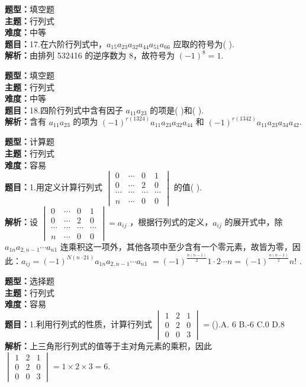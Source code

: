 \documentclass{ctexart}
\newenvironment{question}[5]{%
	\noindent\textbf{题型：}#1\\
	\textbf{主题：}#2\\
	\textbf{难度：}#3\\
	\textbf{题目：}#4\\
	\textbf{解析：}#5\\
	\vspace{1em}
}{}
\begin{document}
	\begin{question}
		{填空题}
		{行列式}
		{中等}
		{17.在六阶行列式中，\(a_{15} a_{23} a_{32} a_{44} a_{51} a_{66}\) 应取的符号为(  ).}
		{由排列 532416 的逆序数为 8，故符号为 \((-1)^8 = 1\).}
	\end{question}
	
	\begin{question}
		{填空题}
		{行列式}
		{中等}
		{18.四阶行列式中含有因子 \(a_{11} a_{23}\) 的项是(  )和(  ).}
		{含有 \(a_{11} a_{23}\) 的项为 \((-1)^{r(1324)} a_{11} a_{23} a_{32} a_{44}\) 和 \((-1)^{r(1342)} a_{11} a_{23} a_{34} a_{42}\).}
	\end{question}
	
	
	\begin{question}
		{计算题}
		{行列式}
		{容易}
		{1.用定义计算行列式 \(\begin{vmatrix}0 & \cdots & 0 & 1 \\ 0 & \cdots & 2 & 0 \\ \cdots & \cdots & \cdots & \cdots \\ n & \cdots & 0 & 0\end{vmatrix}\) 的值(  ).}
		{设 \(\begin{vmatrix}0 & \cdots & 0 & 1 \\ 0 & \cdots & 2 & 0 \\ \cdots & \cdots & \cdots & \cdots \\ n & \cdots & 0 & 0\end{vmatrix}=a_{i j}\) ，根据行列式的定义，\(a_{i j}\)
			的展开式中，除 \(a_{1 n} a_{2, n-1} \cdots a_{n 1}\) 连乘积这一项外，其他各项中至少含有一个零元素，故皆为零，因此：\(a_{i j}=(-1)^{N(n \cdot 21)} a_{1 n} a_{2, n-1} \cdots a_{n 1}\) \(=(-1)^{\frac{n(n-1)}{2}} 1 \cdot 2 \cdots n=(-1)^{\frac{n(n-1)}{2}} n!\) .}
	\end{question}
	
	\begin{question}
		{选择题}
		{行列式}
		{容易}
		{1.利用行列式的性质，计算行列式 \(\begin{vmatrix}1 & 2 & 1 \\ 0 & 2 & 0 \\ 0 & 0 & 3\end{vmatrix}=\)().A. 6 B.-6 C.0 D.8}
		{上三角形行列式的值等于主对角元素的乘积，因此 \(\begin{vmatrix}1 & 2 & 1 \\ 0 & 2 & 0 \\ 0 & 0 & 3\end{vmatrix}=1 \times 2 \times 3=6\).}
	\end{question}	
	
\end{document}
